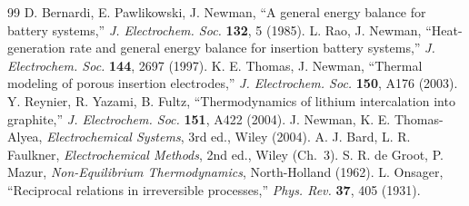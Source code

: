 \documentclass[11pt,a4paper]{article}
\begin{document}
\begin{thebibliography}{99}
 D. Bernardi, E. Pawlikowski, J. Newman, ``A general energy balance for battery systems,'' \emph{J. Electrochem. Soc.} \textbf{132}, 5 (1985).
 L. Rao, J. Newman, ``Heat-generation rate and general energy balance for insertion battery systems,'' \emph{J. Electrochem. Soc.} \textbf{144}, 2697 (1997).
 K. E. Thomas, J. Newman, ``Thermal modeling of porous insertion electrodes,'' \emph{J. Electrochem. Soc.} \textbf{150}, A176 (2003).
 Y. Reynier, R. Yazami, B. Fultz, ``Thermodynamics of lithium intercalation into graphite,'' \emph{J. Electrochem. Soc.} \textbf{151}, A422 (2004).
 J. Newman, K. E. Thomas-Alyea, \emph{Electrochemical Systems}, 3rd ed., Wiley (2004).
 A. J. Bard, L. R. Faulkner, \emph{Electrochemical Methods}, 2nd ed., Wiley (Ch.~3).
 S. R. de Groot, P. Mazur, \emph{Non-Equilibrium Thermodynamics}, North-Holland (1962).
 L. Onsager, ``Reciprocal relations in irreversible processes,'' \emph{Phys. Rev.} \textbf{37}, 405 (1931).
\end{thebibliography}
\end{document}
